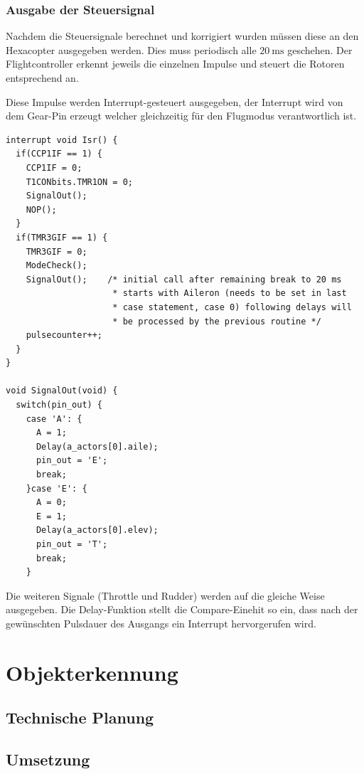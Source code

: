 \begin{itemize}
    \subsubsection{Ausgabe der Steuersignal}
    Nachdem die Steuersignale berechnet und korrigiert wurden müssen diese an den Hexacopter ausgegeben werden. Dies muss periodisch alle $\SI{20}{\milli\second}$ geschehen.
    Der Flightcontroller erkennt jeweils die einzelnen Impulse und steuert die Rotoren entsprechend an.

    Diese Impulse werden Interrupt-gesteuert ausgegeben, der Interrupt wird von dem Gear-Pin erzeugt welcher gleichzeitig für den Flugmodus verantwortlich ist.

    \lstset{language = c}
    \begin{lstlisting}
interrupt void Isr() {
  if(CCP1IF == 1) {
    CCP1IF = 0;
    T1CONbits.TMR1ON = 0;
    SignalOut();
    NOP();
  }
  if(TMR3GIF == 1) {
    TMR3GIF = 0;
    ModeCheck();
    SignalOut();    /* initial call after remaining break to 20 ms
                     * starts with Aileron (needs to be set in last
                     * case statement, case 0) following delays will
                     * be processed by the previous routine */
    pulsecounter++;
  }
}

void SignalOut(void) {
  switch(pin_out) {
    case 'A': {
      A = 1;
      Delay(a_actors[0].aile);
      pin_out = 'E';
      break;
    }case 'E': {
      A = 0;
      E = 1;
      Delay(a_actors[0].elev);
      pin_out = 'T';
      break;
    }
    \end{lstlisting}
    Die weiteren Signale (Throttle und Rudder) werden auf die gleiche Weise ausgegeben.
    Die Delay-Funktion stellt die Compare-Einehit so ein, dass nach der gewünschten Pulsdauer des Ausgangs ein Interrupt hervorgerufen wird.

\section{Objekterkennung}

  \subsection{Technische Planung}

  \subsection{Umsetzung}


\end{itemize}
